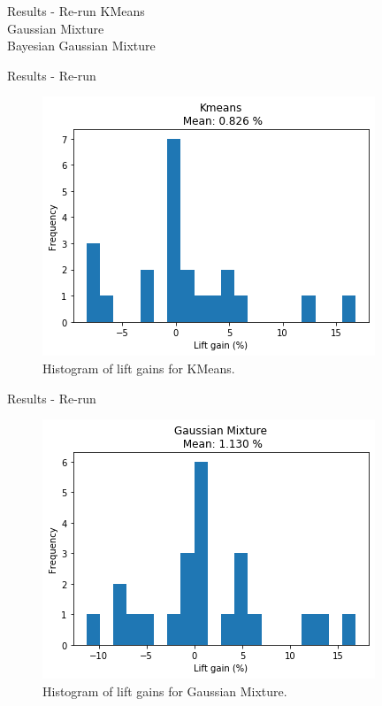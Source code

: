 
\begin{frame}{Results - Re-run \fullNameExperimentII{}} \pause
    KMeans \\
    \vspace{0.5cm}
    Gaussian Mixture \\
    \vspace{0.5cm}
    Bayesian Gaussian Mixture
\end{frame}


\begin{frame}{Results - Re-run \fullNameExperimentII{}}
    \begin{figure}
        \centering
        \includegraphics[width=.75\linewidth]{fig/ch4-kmeans_lift_gain_hist.png}
        \caption{Histogram of lift gains for KMeans.}
    \end{figure}
\end{frame}


\begin{frame}{Results - Re-run \fullNameExperimentII{}}
    \begin{figure}
        \centering
        \includegraphics[width=.75\linewidth]{fig/ch4-gmm_lift_gain_hist.png}
        \caption{Histogram of lift gains for Gaussian Mixture.}
    \end{figure}
\end{frame}

